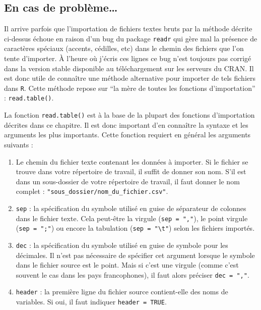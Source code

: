 \documentclass[
  letterpaper,
  DIV=11,
  numbers=noendperiod]{scrreprt}
\providecommand{\tightlist}{%
  \setlength{\itemsep}{0pt}\setlength{\parskip}{0pt}}\usepackage{longtable,booktabs,array}
\begin{document}
\hypertarget{importproblem}{%
\subsection{En cas de problème\ldots{}}\label{importproblem}}

Il arrive parfois que l'importation de fichiers textes bruts par la
méthode décrite ci-dessus échoue en raison d'un bug du package
\texttt{readr} qui gère mal la présence de caractères spéciaux (accents,
cédilles, etc) dans le chemin des fichiers que l'on tente d'importer. À
l'heure où j'écris ces lignes ce bug n'est toujours pas corrigé dans la
version stable disponible au téléchargement sur les serveurs du CRAN. Il
est donc utile de connaître une méthode alternative pour importer de
tels fichiers dans \texttt{R}. Cette méthode repose sur ``la mère de
toutes les fonctions d'importation'' : \texttt{read.table()}.

La fonction \texttt{read.table()} est à la base de la plupart des
fonctions d'importation décrites dans ce chapitre. Il est donc important
d'en connaître la syntaxe et les arguments les plus importants. Cette
fonction requiert en général les arguments suivants :

\begin{enumerate}
\def\labelenumi{\arabic{enumi}.}
\tightlist
\item
  Le chemin du fichier texte contenant les données à importer. Si le
  fichier se trouve dans votre répertoire de travail, il suffit de
  donner son nom. S'il est dans un sous-dossier de votre répertoire de
  travail, il faut donner le nom complet :
  \texttt{"sous\_dossier/nom\_du\_fichier.csv"}.
\item
  \texttt{sep} : la spécification du symbole utilisé en guise de
  séparateur de colonnes dans le fichier texte. Cela peut-être la
  virgule (\texttt{sep\ =\ ","}), le point virgule
  (\texttt{sep\ =\ ";"}) ou encore la tabulation
  (\texttt{sep\ =\ "\textbackslash{}t"}) selon les fichiers importés.
\item
  \texttt{dec} : la spécification du symbole utilisé en guise de symbole
  pour les décimales. Il n'est pas nécessaire de spécifier cet argument
  lorsque le symbole dans le fichier source est le point. Mais si c'est
  une virgule (comme c'est souvent le cas dans les pays francophones),
  il faut alors préciser \texttt{dec\ =\ ","}.
\item
  \texttt{header} : la première ligne du fichier source contient-elle
  des noms de variables. Si oui, il faut indiquer
  \texttt{header\ =\ TRUE}.
\end{enumerate}
\end{document}
